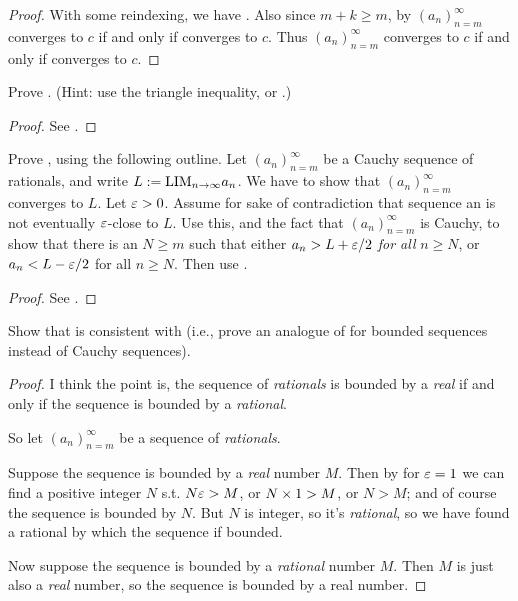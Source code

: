 \begin{proof}
With some reindexing, we have .
Also since \(m + k \geq m\), by  \((a_n)_{n = m}^{\infty}\) converges to \(c\) if and only if  converges to \(c\).
Thus \((a_n)_{n = m}^{\infty}\) converges to \(c\) if and only if  converges to \(c\).
\end{proof}

\begin{exercise} \label{exercise 6.1.5}
Prove .
(Hint: use the triangle inequality, or .)
\end{exercise}

\begin{proof}
See .
\end{proof}

\begin{exercise} \label{exercise 6.1.6}
Prove , using the following outline.
Let \((a_n)_{n = m}^{\infty}\) be a Cauchy sequence of rationals, and write \(L := \text{LIM}_{n \to \infty} a_n\).
We have to show that \((a_n)_{n = m}^{\infty}\) converges to \(L\).
Let \(\varepsilon > 0\).
Assume for sake of contradiction that sequence an is not eventually \(\varepsilon\)-close to \(L\).
Use this, and the fact that \((a_n)_{n = m}^{\infty}\) is Cauchy, to show that there is an \(N \ge m\) such that either \(a_n > L + \varepsilon/2\) \emph{for all} \(n \ge N\), or \(a_n < L - \varepsilon/2\) for all \(n \ge N\).
Then use .
\end{exercise}

\begin{proof}
See .
\end{proof}

\begin{exercise} \label{exercise 6.1.7}
Show that  is consistent with 
(i.e., prove an analogue of  for bounded sequences instead of Cauchy sequences).
\end{exercise}

\begin{proof}
I think the point is, the sequence of \emph{rationals} is bounded by a \emph{real} if and only if the sequence is bounded by a \emph{rational}.

So let \((a_n)_{n = m}^{\infty}\) be a sequence of \emph{rationals}.

Suppose the sequence is bounded by a \emph{real} number \(M\).
Then by  for \(\varepsilon = 1\) we can find a positive integer \(N\) s.t. \(N \varepsilon > M\), or \(N \times 1 > M\), or \(N > M\);
and of course the sequence is bounded by \(N\).
But \(N\) is integer, so it's \emph{rational}, so we have found a rational by which the sequence if bounded.

Now suppose the sequence is bounded by a \emph{rational} number \(M\).
Then \(M\) is just also a \emph{real} number, so the sequence is bounded by a real number.
\end{proof}


